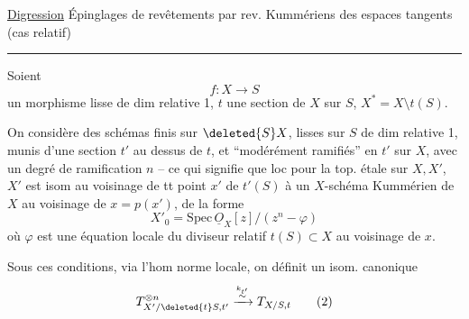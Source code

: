 \uline{Digression} Épinglages de revêtements par  rev. Kummériens des espaces tangents (cas relatif)
\par\noindent\rule{\linewidth}{0.4pt}\par

Soient
\[
 f:X\longrightarrow S \tag*{(1)}
\]
un morphisme lisse de dim relative 1, $t$ une section de $X$ sur $S$, $X^\ast=X\setminus t(S)$.

On considère des schémas  finis sur $\deleted{S} X$, lisses sur $S$ de dim relative 1, munis d'une section $t'$ au dessus de $t$, et ``modérément ramifiés'' en $t'$ sur $X$, avec un degré de ramification $n$ -- ce qui signifie que
loc pour la top. étale sur $X,X'$, $X'$ est isom au voisinage de tt point $x'$ de $t'(S)$ à un $X$-schéma Kummérien de $X$ au voisinage de $x=p(x')$, de la forme
\[
 X'_0=\mathrm{Spec}\,\underline O_X[z]/(z^n-\varphi)
\]
où $\varphi$ est une équation locale du diviseur relatif $t(S)\subset X$ au voisinage de $x$.

Sous ces conditions, via l'hom norme locale, on définit un isom. canonique
\[
 T_{X'/\deleted{t}S,t'}^{\otimes n}\xrightarrow{\overset{k_{t'}}{\sim}}T_{X/S,t} \tag*{(2)}
\]
